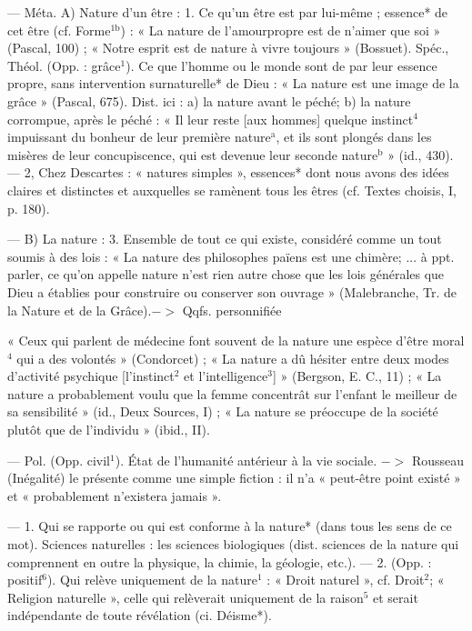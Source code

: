 \begin{itemize}[leftmargin=1cm, label=, itemsep=1pt]
 — Méta. A) Nature d'un
être : 1. Ce qu'un être est par lui-même ; essence* de cet être (cf.
Forme$^\text{1b}$) : « La nature de l’amourpropre est de n’aimer que soi »
(Pascal, 100) ; « Notre esprit est de
nature à vivre toujours » (Bossuet).
Spéc., Théol. (Opp. : grâce$^1$). Ce que
l’homme ou le monde sont de par
leur essence propre, sans intervention surnaturelle* de Dieu : « La
nature est une image de la grâce »
(Pascal, 675). Dist. ici : a) la nature
avant le péché; b) la nature corrompue, après le péché : « Il leur
reste [aux hommes] quelque instinct$^4$ impuissant du bonheur de
leur première nature$^\text{a}$, et ils sont
plongés dans les misères de leur
concupiscence, qui est devenue leur
seconde nature$^\text{b}$ » (id., 430). — 2,
Chez Descartes : « natures simples »,
essences* dont nous avons des idées
claires et distinctes et auxquelles
se ramènent tous les êtres (cf.
Textes choisis, I, p. 180).

— B) La nature : 3. Ensemble de
tout ce qui existe, considéré comme
un tout soumis à des lois : « La
nature des philosophes païens est
une chimère; ... à ppt. parler, ce
qu’on appelle nature n’est rien
autre chose que les lois générales
que Dieu a établies pour construire
ou conserver son ouvrage » (Malebranche, Tr. de la Nature et de la
Grâce).$->$  Qqfs. personnifiée

« Ceux qui parlent de médecine
font souvent de la nature une espèce
d'être moral$^4$ qui a des volontés »
(Condorcet) ; « La nature a dû hésiter
entre deux modes d'activité psychique [l’instinct$^2$ et l'intelligence$^3$] »
(Bergson, E. C., 11) ; « La nature
a probablement voulu que la femme
concentrât sur l'enfant le meilleur
de sa sensibilité » (id., Deux Sources,
I) ; « La nature se préoccupe de la
société plutôt que de l'individu »
(ibid., II).

 — Pol. (Opp.
civil$^1$). État de l'humanité antérieur
à la vie sociale. $->$ Rousseau (Inégalité) le présente comme une simple
fiction : il n'a « peut-être point
existé » et « probablement n’existera
jamais ».

 — 1. Qui se rapporte ou qui
est conforme à la nature* (dans
tous les sens de ce mot). Sciences
naturelles : les sciences biologiques
(dist. sciences de la nature qui comprennent en outre la physique, la
chimie, la géologie, etc.). — 2. (Opp. :
positif$^6$). Qui relève uniquement de
la nature$^1$ : « Droit naturel », cf.
Droit$^2$; « Religion naturelle », celle
qui relèverait uniquement de la
raison$^5$ et serait indépendante de
toute révélation (ci. Déisme*).


\end{itemize}

